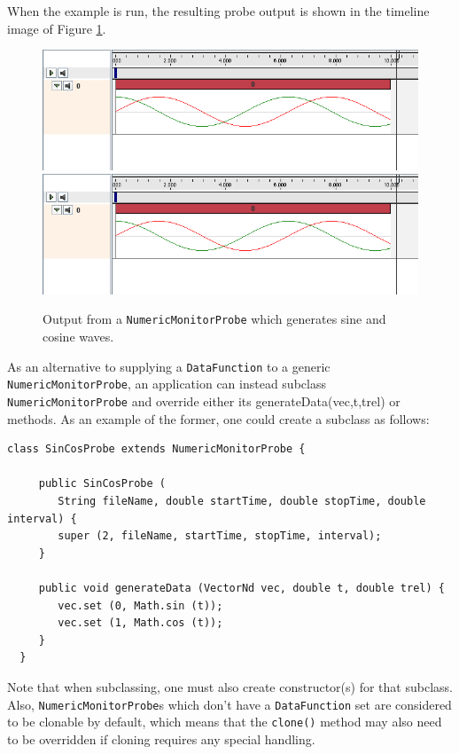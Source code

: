 When the example is run, the resulting probe output is shown in the
timeline image of Figure \ref{sinCosProbe:fig}.

\begin{figure}[ht]
\begin{center}
\iflatexml
 \includegraphics[]{images/sinCosProbe}
\else
 \includegraphics[width=4.5in]{images/sinCosProbe}
\fi
\end{center}
\caption{Output from a {\tt NumericMonitorProbe} which generates sine
and cosine waves.}
\label{sinCosProbe:fig}
\end{figure}

As an alternative to supplying a {\tt DataFunction} to a generic {\tt
NumericMonitorProbe}, an application can instead subclass {\tt
NumericMonitorProbe} and override either its %
{generateData(vec,t,trel)} or 
methods. As an example of the former, one could create a subclass as
follows:
%
\begin{lstlisting}[]
  class SinCosProbe extends NumericMonitorProbe {
     
     public SinCosProbe (
        String fileName, double startTime, double stopTime, double interval) {
        super (2, fileName, startTime, stopTime, interval);
     }

     public void generateData (VectorNd vec, double t, double trel) {
        vec.set (0, Math.sin (t));
        vec.set (1, Math.cos (t));        
     }
  }
\end{lstlisting}
%
Note that when subclassing, one must also create constructor(s) for
that subclass. Also, {\tt NumericMonitorProbe}s which don't have a
{\tt DataFunction} set are considered to be clonable by default, which
means that the {\tt clone()} method may also need to be overridden if
cloning requires any special handling.

